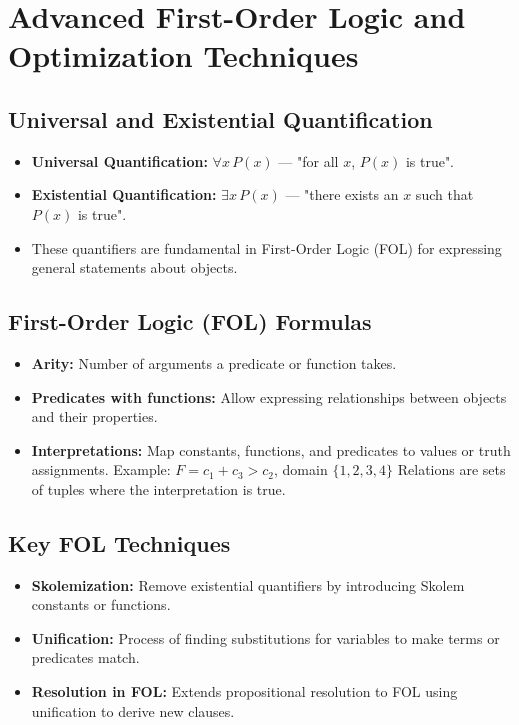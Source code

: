 \section{Advanced First-Order Logic and Optimization Techniques}

\subsection{Universal and Existential Quantification}
\begin{itemize}
    \item \textbf{Universal Quantification:} $\forall x \, P(x)$ — "for all $x$, $P(x)$ is true".
    \item \textbf{Existential Quantification:} $\exists x \, P(x)$ — "there exists an $x$ such that $P(x)$ is true".
    \item These quantifiers are fundamental in First-Order Logic (FOL) for expressing general statements about objects.
\end{itemize}

\subsection{First-Order Logic (FOL) Formulas}
\begin{itemize}
    \item \textbf{Arity:} Number of arguments a predicate or function takes.
    \item \textbf{Predicates with functions:} Allow expressing relationships between objects and their properties.
    \item \textbf{Interpretations:} Map constants, functions, and predicates to values or truth assignments.  
        Example: $F = c_1 + c_3 > c_2$, domain $\{1,2,3,4\}$  
        Relations are sets of tuples where the interpretation is true.
\end{itemize}

\subsection{Key FOL Techniques}
\begin{itemize}
    \item \textbf{Skolemization:} Remove existential quantifiers by introducing Skolem constants or functions.
    \item \textbf{Unification:} Process of finding substitutions for variables to make terms or predicates match.
    \item \textbf{Resolution in FOL:} Extends propositional resolution to FOL using unification to derive new clauses.
\end{itemize}

